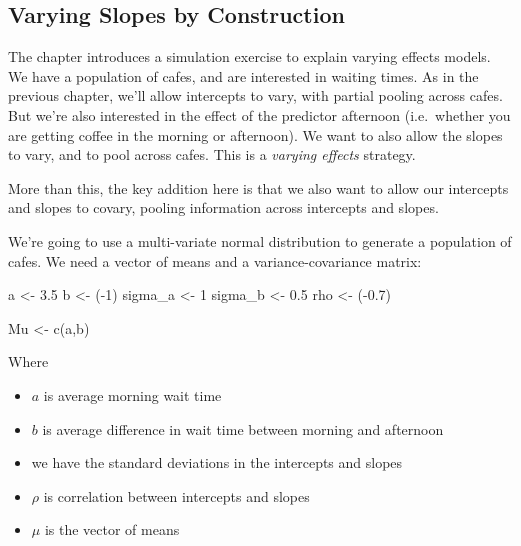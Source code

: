 \documentclass[
]{book}
\newenvironment{Shaded}{\begin{snugshade}}{\end{snugshade}}
\newcommand{\DecValTok}[1]{\textcolor[rgb]{0.00,0.00,0.81}{#1}}
\newcommand{\FloatTok}[1]{\textcolor[rgb]{0.00,0.00,0.81}{#1}}
\newcommand{\FunctionTok}[1]{\textcolor[rgb]{0.00,0.00,0.00}{#1}}
\newcommand{\NormalTok}[1]{#1}
\newcommand{\OtherTok}[1]{\textcolor[rgb]{0.56,0.35,0.01}{#1}}
\newcommand{\SpecialCharTok}[1]{\textcolor[rgb]{0.00,0.00,0.00}{#1}}
\providecommand{\tightlist}{%
  \setlength{\itemsep}{0pt}\setlength{\parskip}{0pt}}
\begin{document}
\hypertarget{varying-slopes-by-construction}{%
\subsection*{Varying Slopes by Construction}\label{varying-slopes-by-construction}}

The chapter introduces a simulation exercise to explain varying effects models. We have a population of cafes, and are interested in waiting times. As in the previous chapter, we'll allow intercepts to vary, with partial pooling across cafes. But we're also interested in the effect of the predictor afternoon (i.e.~whether you are getting coffee in the morning or afternoon). We want to also allow the slopes to vary, and to pool across cafes. This is a \emph{varying effects} strategy.

More than this, the key addition here is that we also want to allow our intercepts and slopes to covary, pooling information across intercepts and slopes.

We're going to use a multi-variate normal distribution to generate a population of cafes. We need a vector of means and a variance-covariance matrix:

\begin{Shaded}
\begin{Highlighting}[]
\NormalTok{a }\OtherTok{\textless{}{-}} \FloatTok{3.5} 
\NormalTok{b }\OtherTok{\textless{}{-}}\NormalTok{ (}\SpecialCharTok{{-}}\DecValTok{1}\NormalTok{)}
\NormalTok{sigma\_a }\OtherTok{\textless{}{-}} \DecValTok{1} 
\NormalTok{sigma\_b }\OtherTok{\textless{}{-}} \FloatTok{0.5} 
\NormalTok{rho }\OtherTok{\textless{}{-}}\NormalTok{ (}\SpecialCharTok{{-}}\FloatTok{0.7}\NormalTok{)}

\NormalTok{Mu }\OtherTok{\textless{}{-}} \FunctionTok{c}\NormalTok{(a,b)}
\end{Highlighting}
\end{Shaded}

Where

\begin{itemize}
\tightlist
\item
  \(a\) is average morning wait time
\item
  \(b\) is average difference in wait time between morning and afternoon
\item
  we have the standard deviations in the intercepts and slopes
\item
  \(\rho\) is correlation between intercepts and slopes
\item
  \(\mu\) is the vector of means
\end{itemize}
\end{document}
